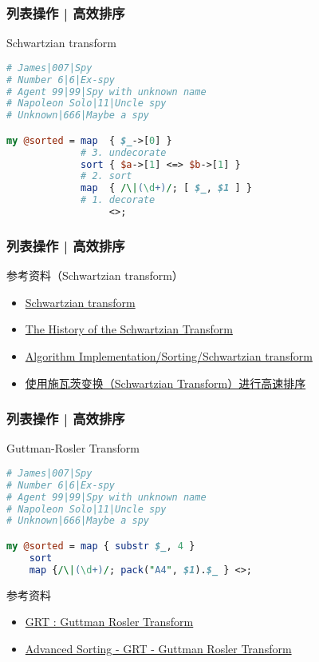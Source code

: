 \begin{frame}[fragile]
  \frametitle{列表操作 | 高效排序}
  \begin{block}{Schwartzian transform}
    \vspace{-1em}
\begin{lstlisting}[language=Perl]
# James|007|Spy
# Number 6|6|Ex-spy
# Agent 99|99|Spy with unknown name
# Napoleon Solo|11|Uncle spy
# Unknown|666|Maybe a spy

my @sorted = map  { $_->[0] }
             # 3. undecorate
             sort { $a->[1] <=> $b->[1] }
             # 2. sort
             map  { /\|(\d+)/; [ $_, $1 ] }
             # 1. decorate
                  <>;
\end{lstlisting}
  \end{block}
\end{frame}

\begin{frame}
  \frametitle{列表操作 | 高效排序}
  \begin{block}{参考资料（Schwartzian transform）}
    \begin{itemize}
      \item \href{https://www.wikiwand.com/en/Schwartzian_transform}{Schwartzian transform}
      \item \href{https://www.perl.com/article/the-history-of-the-schwartzian-transform/}{The History of the Schwartzian Transform}
      \item \href{https://en.wikibooks.org/wiki/Algorithm_Implementation/Sorting/Schwartzian_transform}{Algorithm Implementation/Sorting/Schwartzian transform}
      \item \href{https://blog.csdn.net/iSpeller/article/details/48161395}{使用施瓦茨变换（Schwartzian Transform）进行高速排序}
    \end{itemize}
  \end{block}
\end{frame}

\begin{frame}[fragile]
  \frametitle{列表操作 | 高效排序}
  \begin{block}{Guttman-Rosler Transform}
    \vspace{-1em}
\begin{lstlisting}[language=Perl]
# James|007|Spy
# Number 6|6|Ex-spy
# Agent 99|99|Spy with unknown name
# Napoleon Solo|11|Uncle spy
# Unknown|666|Maybe a spy

my @sorted = map { substr $_, 4 }
    sort
    map {/\|(\d+)/; pack("A4", $1).$_ } <>;
\end{lstlisting}
  \end{block}
  \begin{block}{参考资料}
    \begin{itemize}
      \item \href{http://www.lowlevelmanager.com/2010/10/grt-guttman-rosler-transform.html}{GRT : Guttman Rosler Transform}
      \item \href{https://www.perlmonks.org/?node_id=145659}{Advanced Sorting - GRT - Guttman Rosler Transform}
    \end{itemize}
  \end{block}
\end{frame}

